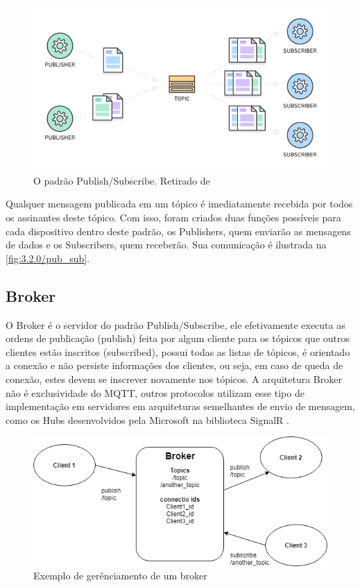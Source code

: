\begin{figure}[h!]
\centering
\includegraphics[width=12cm]{./02_Capitulos/02_Cap3/figures/aws_pub_sub}
\caption{O padrão Publish/Subscribe. Retirado de \cite{amazon:pub-sub}}
\label{fig:3.2.0/aws_pub_sub}
\end{figure}

Qualquer mensagem publicada em um tópico é imediatamente recebida por todos os assinantes deste tópico. Com isso, foram criados duas funções possíveis para cada dispositivo dentro deste padrão, os Publishers, quem enviarão as mensagens de dados e os Subscribers, quem receberão. Sua comunicação é ilustrada na \ref{fig:3.2.0/pub_sub}.

\subsection{Broker}
\label{subsection:broker}

O Broker é o servidor do padrão Publish/Subscribe, ele efetivamente executa as ordens de publicação (publish) feita por algum cliente para os tópicos que outros clientes estão inscritos (subscribed), possui todas as listas de tópicos, é orientado a conexão e não persiste informações dos clientes, ou seja, em caso de queda de conexão, estes devem se inscrever novamente nos tópicos.  A arquitetura Broker não é exclusividade do MQTT, outros protocolos utilizam esse tipo de implementação em servidores em arquiteturas semelhantes de envio de mensagem, como os Hubs desenvolvidos pela Microsoft na biblioteca SignalR \cite{signalr}.

\begin{figure}[h]
\centering
\includegraphics[width=12cm]{./02_Capitulos/02_Cap3/figures/broker_pub_sub}
\caption{Exemplo de gerênciamento de um broker}
\label{fig:3.2.0/broker_pub_sub}
\end{figure}

